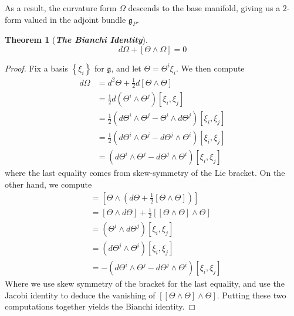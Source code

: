 \documentclass[psamsfonts, 12pt]{amsart}
\newtheorem{thm}{Theorem}[section]
\theoremstyle{definition}
\theoremstyle{remark}
\newcommand{\ib}[1]{\textbf{\textit{#1}}}
\newcommand{\g}{\mathfrak{g}}
\newcommand{\set}[1]{\left\lbrace #1 \right\rbrace}
\begin{document}
%
As a result, the curvature form $\Omega$ descends to the base manifold, giving
us a $2$-form valued in the adjoint bundle $\g_P$.
%
\begin{thm}[\ib{The Bianchi Identity}]
\[
d\Omega + [\Theta\wedge\Omega] = 0
\]
\end{thm}
%
\begin{proof}
Fix a basis $\set{\xi_i}$ for $\g$, and let $\Theta = \Theta^i\xi_i$. We then compute
\begin{align*}
d\Omega &= d^2\Theta + \frac{1}{2}d[\Theta \wedge \Theta] \\
&= \frac{1}{2}d(\Theta^i \wedge \Theta^j)[\xi_i,\xi_j] \\
&= \frac{1}{2}(d\Theta^i \wedge \Theta^j - \Theta^i \wedge d\Theta^j)[\xi_i,\xi_j] \\
&= \frac{1}{2}(d\Theta^i \wedge \Theta^j - d\Theta^j \wedge \Theta^i)[\xi_i,\xi_j] \\
&= (d\Theta^i \wedge \Theta^j - d\Theta^j \wedge \Theta^i)[\xi_i,\xi_j]
\end{align*}
where the last equality comes from skew-symmetry of the Lie bracket. On the other hand,
we compute
\begin{align*}
[\Theta\wedge\Omega]
&= \left[\Theta\wedge\left(d\Theta + \frac{1}{2}[\Theta\wedge\Theta]\right)\right] \\
&=[\Theta\wedge d\Theta] + \frac{1}{2}[[\Theta\wedge\Theta]\wedge\Theta] \\
&= (\Theta^i\wedge d\Theta^j)[\xi_i,\xi_j] \\
&= (d\Theta^j \wedge \Theta^i)[\xi_i,\xi_j] \\
&= -(d\Theta^i \wedge \Theta^j - d\Theta^j\wedge\Theta^i)[\xi_i,\xi_j]
\end{align*}
Where we use skew symmetry of the bracket for the last equality, and use the
Jacobi identity to deduce the vanishing of $[[\Theta\wedge\Theta]\wedge\Theta]$.
Putting these two computations together yields the Bianchi identity.
\end{proof}
%
\end{document}
